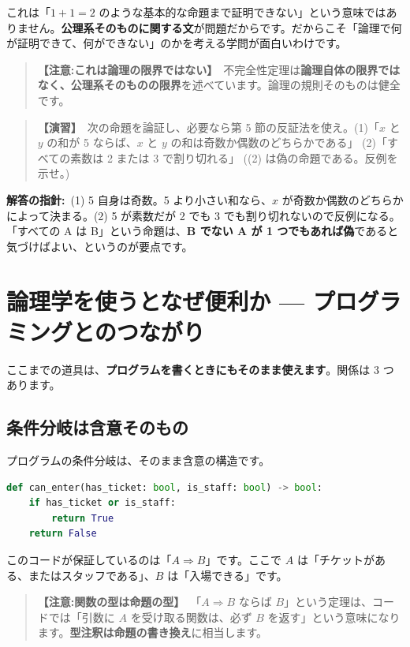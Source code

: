 \documentclass{article}
\begin{document}
これは「\(1+1=2\) のような基本的な命題まで証明できない」という意味ではありません。\textbf{公理系そのものに関する文}が問題だからです。だからこそ「論理で何が証明できて、何ができない」のかを考える学問が面白いわけです。

\begin{quote}
\textbf{【注意:これは論理の限界ではない】}\ 不完全性定理は\textbf{論理自体の限界ではなく、公理系そのものの限界}を述べています。論理の規則そのものは健全です。
\end{quote}

\begin{quote}
\textbf{【演習】}\ 次の命題を論証し、必要なら第 5 節の反証法を使え。(1)「\(x\) と \(y\) の和が 5 ならば、\(x\) と \(y\) の和は奇数か偶数のどちらかである」 (2)「すべての素数は 2 または 3 で割り切れる」 ((2) は偽の命題である。反例を示せ。)
\end{quote}

\textbf{解答の指針:}\ (1) 5 自身は奇数。5 より小さい和なら、\(x\) が奇数か偶数のどちらかによって決まる。(2) 5 が素数だが 2 でも 3 でも割り切れないので反例になる。「すべての A は B」という命題は、\textbf{B でない A が 1 つでもあれば偽}であると気づけばよい、というのが要点です。

\section{論理学を使うとなぜ便利か — プログラミングとのつながり}

ここまでの道具は、\textbf{プログラムを書くときにもそのまま使えます}。関係は 3 つあります。

\subsection{条件分岐は含意そのもの}

プログラムの条件分岐は、そのまま含意の構造です。

\begin{lstlisting}[language=Python]
def can_enter(has_ticket: bool, is_staff: bool) -> bool:
    if has_ticket or is_staff:
        return True
    return False
\end{lstlisting}

このコードが保証しているのは「\(A \Rightarrow B\)」です。ここで \(A\) は「チケットがある、またはスタッフである」、\(B\) は「入場できる」です。

\begin{quote}
\textbf{【注意:関数の型は命題の型】}\ 「\(A \Rightarrow B\) ならば \(B\)」という定理は、コードでは「引数に \(A\) を受け取る関数は、必ず \(B\) を返す」という意味になります。\textbf{型注釈は命題の書き換え}に相当します。
\end{quote}
\end{document}
